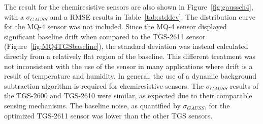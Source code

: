 \documentclass[sensors,article,submit,moreauthors,pdftex]{Definitions/mdpi}
\begin{document}
			The result for the chemiresistive  sensors are also shown in Figure~\ref{fig:gaussch4}, with a $\sigma_{GAUSS}$ and a RMSE results in Table~\ref{tab:stddev}.
			The distribution curve for the MQ-4 sensor was not included.
			Since the MQ-4 sensor displayed significant baseline drift when compared to the TGS-2611 sensor (Figure~\ref{fig:MQ4TGSbaseline}), the standard deviation was instead calculated directly from a relatively flat region of the baseline.
			This different treatment was not inconsistent with the use of the sensor in many applications where drift is a result of temperature and humidity.
			In general, the use of a dynamic background subtraction algorithm is required for chemiresistive sensors.
			The $\sigma_{GAUSS}$ results of the TGS-2600 and TGS-2610 were similar, as expected due to their comparable sensing mechanisms.
			The baseline noise, as quantified by $\sigma_{GAUSS}$, for the  optimized TGS-2611 sensor was lower than the other TGS sensors.
			
\end{document}
